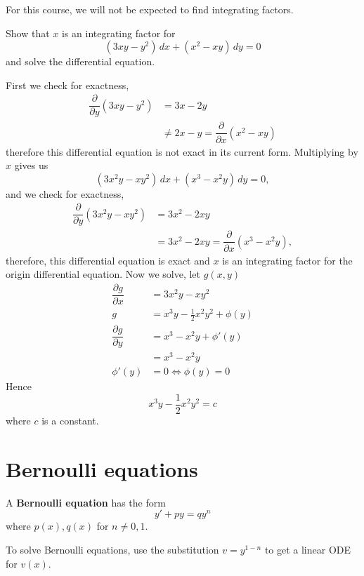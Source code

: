 \begin{remark}
    For this course, we will not be expected to find integrating factors.
\end{remark}

\begin{example}
    Show that $x$ is an integrating factor for \[(3xy-y^2)\,dx+(x^2-xy)\,dy=0\] and solve the differential equation.
    
    First we check for exactness,
    \begin{align*}
        \dfrac{\partial}{\partial y}(3xy-y^2)&=3x-2y\\
        &\neq2x-y=\dfrac{\partial}{\partial x}(x^2-xy)
    \end{align*}
    therefore this differential equation is not exact in its current form. Multiplying by $x$ gives us \[(3x^2y-xy^2)\,dx+(x^3-x^2y)\,dy=0,\]
    and we check for exactness,
    \begin{align*}
        \dfrac{\partial}{\partial y}(3x^2y-xy^2)&=3x^2-2xy\\
        &=3x^2-2xy=\dfrac{\partial}{\partial x}(x^3-x^2y),
    \end{align*}
    therefore, this differential equation is exact and $x$ is an integrating factor for the origin differential equation. Now we solve, let $g(x,y)$
    \begin{align*}
        \dfrac{\partial g}{\partial x}&=3x^2y-xy^2\\
        g&=x^3y-\frac12x^2y^2+\phi(y)\\
        \dfrac{\partial g}{\partial y}&=x^3-x^2y+\phi'(y)\\
        &=x^3-x^2y\\
        \phi'(y)&=0\iff\phi(y)=0
    \end{align*}
    Hence \[x^3y-\frac12x^2y^2=c\] where $c$ is a constant.
\end{example}

\section{Bernoulli equations}

\begin{definition}
    A \textbf{Bernoulli equation} has the form \[y'+py=qy^n\] where $p(x),q(x)$ for $n\neq 0,1$.
\end{definition}

To solve Bernoulli equations, use the substitution $v=y^{1-n}$ to get a linear ODE for $v(x)$.

